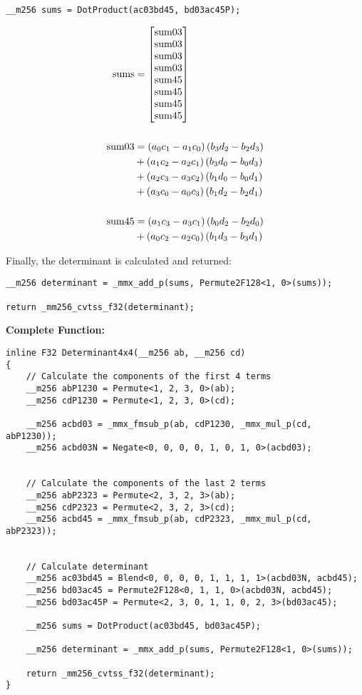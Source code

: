\begin{verbatim}
__m256 sums = DotProduct(ac03bd45, bd03ac45P);
\end{verbatim}
\begin{align*}
\mathrm{sums} 
&=
\begin{bmatrix}
\mathrm{sum03}\\
\mathrm{sum03}\\
\mathrm{sum03}\\
\mathrm{sum03}\\
\mathrm{sum45}\\
\mathrm{sum45}\\
\mathrm{sum45}\\
\mathrm{sum45}\\
\end{bmatrix}\\
\\
\mathrm{sum03}
&=\left(a_0c_1 - a_1c_0\right)\left(b_3d_2 - b_2d_3\right)\\
&+\left(a_1c_2 - a_2c_1\right)\left(b_3d_0 - b_0d_3\right)\\
&+\left(a_2c_3 - a_3c_2\right)\left(b_1d_0 - b_0d_1\right)\\
&+\left(a_3c_0 - a_0c_3\right)\left(b_1d_2 - b_2d_1\right)\\
\\
\mathrm{sum45}
&=\left(a_1c_3 - a_3c_1\right)\left(b_0d_2 - b_2d_0\right)\\
&+\left(a_0c_2 - a_2c_0\right)\left(b_1d_3 - b_3d_1\right)
\end{align*}

Finally, the determinant is calculated and returned:
\begin{verbatim}
__m256 determinant = _mmx_add_p(sums, Permute2F128<1, 0>(sums));

return _mm256_cvtss_f32(determinant);
\end{verbatim}



\vspace{1cm}
\textbf{Complete Function:}
\begin{verbatim}
inline F32 Determinant4x4(__m256 ab, __m256 cd)
{
    // Calculate the components of the first 4 terms
    __m256 abP1230 = Permute<1, 2, 3, 0>(ab);
    __m256 cdP1230 = Permute<1, 2, 3, 0>(cd);

    __m256 acbd03 = _mmx_fmsub_p(ab, cdP1230, _mmx_mul_p(cd, abP1230));
    __m256 acbd03N = Negate<0, 0, 0, 0, 1, 0, 1, 0>(acbd03);


    // Calculate the components of the last 2 terms
    __m256 abP2323 = Permute<2, 3, 2, 3>(ab);
    __m256 cdP2323 = Permute<2, 3, 2, 3>(cd);
    __m256 acbd45 = _mmx_fmsub_p(ab, cdP2323, _mmx_mul_p(cd, abP2323));


    // Calculate determinant
    __m256 ac03bd45 = Blend<0, 0, 0, 0, 1, 1, 1, 1>(acbd03N, acbd45);
    __m256 bd03ac45 = Permute2F128<0, 1, 1, 0>(acbd03N, acbd45);
    __m256 bd03ac45P = Permute<2, 3, 0, 1, 1, 0, 2, 3>(bd03ac45);

    __m256 sums = DotProduct(ac03bd45, bd03ac45P);

    __m256 determinant = _mmx_add_p(sums, Permute2F128<1, 0>(sums));

    return _mm256_cvtss_f32(determinant);
}
\end{verbatim}




